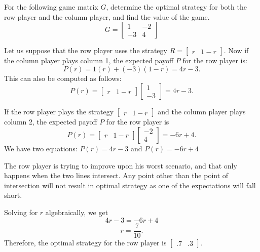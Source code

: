 \begin{example}
    For the following game matrix \( G \), determine the optimal strategy for both the row player and the column player, and find the value of the game.
    \[ G = \begin{bmatrix} 1 & -2 \\ -3 & 4 \end{bmatrix} \]
\end{example}
\begin{solution}
    Let us suppose that the row player uses the strategy \( R = \begin{bmatrix} r & 1 - r \end{bmatrix} \). Now if the column player plays column 1, the expected payoff \( P \) for the row player is:
    \[ P(r) = 1(r) + (-3)(1 - r) = 4r - 3. \]
    This can also be computed as follows:
    \[ P(r) = \begin{bmatrix} r & 1 - r \end{bmatrix} \begin{bmatrix} 1 \\ -3 \end{bmatrix} = 4r - 3. \]



    If the row player plays the strategy \( \begin{bmatrix} r & 1-r \end{bmatrix} \) and the column player plays column 2, the expected payoff \( P \) for the row player is
    \[
        P(r) = \begin{bmatrix} r & 1-r \end{bmatrix} \begin{bmatrix} -2 \\ 4 \end{bmatrix} = -6r + 4.
    \]
    We have two equations: \( P(r) = 4r - 3 \) and \( P(r) = -6r + 4 \)

    The row player is trying to improve upon his worst scenario, and that only happens when the two lines intersect. Any point other than the point of intersection will not result in optimal strategy as one of the expectations will fall short.

    Solving for \( r \) algebraically, we get
    \[
        4r - 3 = -6r + 4
    \]
    \[
        r = \frac{7}{10}.
    \]
    Therefore, the optimal strategy for the row player is \( \begin{bmatrix} .7 & .3 \end{bmatrix} \).


\end{solution}
